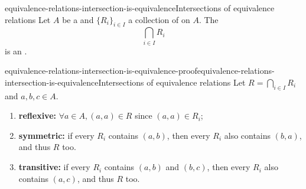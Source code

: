 \documentclass[preview]{standalone}
\begin{document}
\begin{snippetproposition}{equivalence-relations-intersection-is-equivalence}{Intersections of equivalence relations}
    Let \(A\) be a \set and \(\{R_i\}_{i\in I}\) a collection of  on \(A\).
    The \binrelation
    \[ \bigcap_{i\in I} R_i \]
    is an \equivrelation.
\end{snippetproposition}

\begin{snippetproof}{equivalence-relations-intersection-is-equivalence-proof}{equivalence-relations-intersection-is-equivalence}{Intersections of equivalence relations}
    Let \( R=\bigcap_{i\in I} R_i \) and \(a,b,c\in A\).
    \begin{enumerate}
        \item \textbf{reflexive:} \(\forall a \in A, (a,a) \in R\) since \((a,a) \in R_i\);
        \item \textbf{symmetric:} if every \(R_i\) contains \((a,b)\), then every \(R_i\) also contains \((b,a)\),
            and thus \(R\) too. 
        \item \textbf{transitive:} if every \(R_i\) contains \((a,b)\) and \((b,c)\), then every \(R_i\)
            also contains \((a,c)\), and thus \(R\) too.
    \end{enumerate}
\end{snippetproof}
\end{document}
